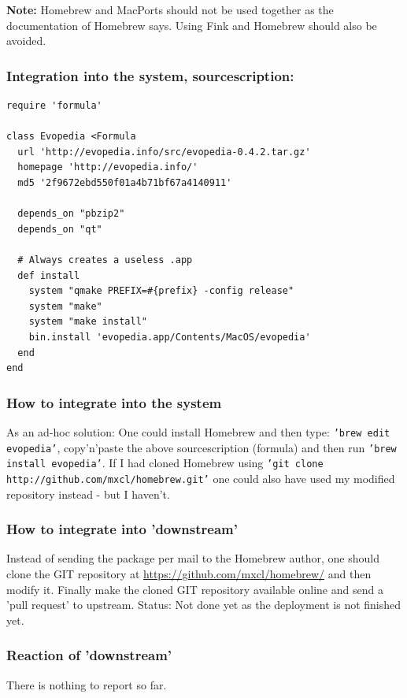 \documentclass[a4paper,10pt]{article}
\begin{document}
\textbf{Note:} Homebrew and MacPorts should not be used together as the documentation of Homebrew says. Using Fink and Homebrew should also be avoided.

\subsubsection*{Integration into the system, sourcescription:}
\begin{verbatim}
require 'formula'

class Evopedia <Formula
  url 'http://evopedia.info/src/evopedia-0.4.2.tar.gz'
  homepage 'http://evopedia.info/'
  md5 '2f9672ebd550f01a4b71bf67a4140911'

  depends_on "pbzip2"
  depends_on "qt"

  # Always creates a useless .app
  def install
    system "qmake PREFIX=#{prefix} -config release"
    system "make"
    system "make install"
    bin.install 'evopedia.app/Contents/MacOS/evopedia'
  end
end

\end{verbatim}

\subsubsection*{How to integrate into the system}
As an ad-hoc solution: One could install Homebrew and then type: \texttt{'brew edit evopedia'}, copy'n'paste the above sourcescription (formula) and then run \texttt{'brew install evopedia'}. If I had cloned Homebrew using \texttt{'git clone http://github.com/mxcl/homebrew.git'} one could also have used my modified repository instead - but I haven't.

\subsubsection*{How to integrate into 'downstream'}
Instead of sending the package per mail to the Homebrew author, one should clone the GIT repository at \url{https://github.com/mxcl/homebrew/} and then modify it. Finally make the cloned GIT repository available online and send a 'pull request' to upstream. Status: Not done yet as the deployment is not finished yet.

\subsubsection*{Reaction of 'downstream'}
There is nothing to report so far.
\end{document}
